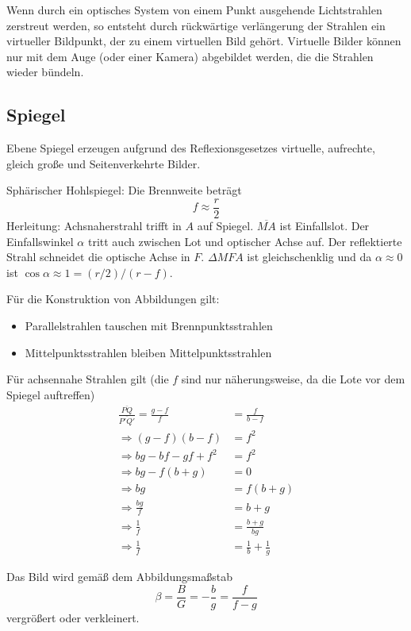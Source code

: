 \documentclass[a4paper]{scrartcl}
\begin{document}
Wenn durch ein optisches System von einem Punkt ausgehende Lichtstrahlen zerstreut werden, so entsteht durch rückwärtige verlängerung der Strahlen ein virtueller Bildpunkt, der zu einem virtuellen Bild gehört. Virtuelle Bilder können nur mit dem Auge (oder einer Kamera) abgebildet werden, die die Strahlen wieder bündeln.

\subsection{Spiegel}
Ebene Spiegel erzeugen aufgrund des Reflexionsgesetzes virtuelle, aufrechte, gleich große und Seitenverkehrte Bilder.

Sphärischer Hohlspiegel: Die Brennweite beträgt
\begin{equation*}
  f \approx \frac{r}{2}
\end{equation*}
Herleitung: Achsnaherstrahl trifft in $A$ auf Spiegel. $\overline{MA}$ ist Einfallslot. Der Einfallswinkel $\alpha$ tritt auch zwischen Lot und optischer Achse auf. Der reflektierte Strahl schneidet die optische Achse in $F$. $\Delta MFA$ ist gleichschenklig und da $\alpha \approx 0$ ist $\cos \alpha \approx 1 = (r/2) / (r-f)$.

Für die Konstruktion von Abbildungen gilt:
\begin{itemize}[noitemsep]
  \item Parallelstrahlen tauschen mit Brennpunktsstrahlen
  \item Mittelpunktsstrahlen bleiben Mittelpunktsstrahlen
\end{itemize}

Für achsennahe Strahlen gilt (die $f$ sind nur näherungsweise, da die Lote vor dem Spiegel auftreffen)
\begin{align*}
  \frac{\overline{PQ}}{\overline{P'Q'}} = \frac{g-f}{f} &= \frac{f}{b-f}\\
  \Rightarrow (g-f)(b-f) &= f^2 \\
  \Rightarrow bg - bf - gf + f^2 &= f^2 \\
  \Rightarrow bg - f(b+g) &= 0\\
  \Rightarrow bg &= f(b+g) \\
  \Rightarrow \frac{bg}{f} &= b+g \\
  \Rightarrow \frac{1}{f} &= \frac{b+g}{bg}\\
  \Rightarrow \frac{1}{f} &= \frac{1}{b} + \frac{1}{g}
\end{align*}

Das Bild wird gemäß dem Abbildungsmaßstab
\begin{equation*}
  \beta = \frac{B}{G} = -\frac{b}{g} = \frac{f}{f-g}
\end{equation*}
vergrößert oder verkleinert.
\end{document}
